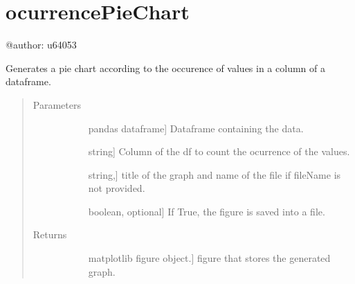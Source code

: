 \documentclass[letterpaper,10pt,english]{sphinxmanual}
\begin{document}
\chapter{ocurrencePieChart}
\label{\detokenize{rstFiles/ocurrencePieChart:module-ocurrencePieChart}}\label{\detokenize{rstFiles/ocurrencePieChart:ocurrencepiechart}}\label{\detokenize{rstFiles/ocurrencePieChart::doc}}
@author: u64053

\begin{fulllineitems}
\label{\detokenize{rstFiles/ocurrencePieChart:ocurrencePieChart.ocurrPieChart}}
Generates a pie chart according to 
the occurence of values in a column of a dataframe.
\begin{quote}\begin{description}
\item[{Parameters}] \leavevmode\begin{description}
\item[{}] \leavevmode{[}pandas dataframe{]}
Dataframe containing the data.

\item[{}] \leavevmode{[}string{]}
Column of the df to count the ocurrence of the values.

\item[{}] \leavevmode{[}string,{]}
title of the graph and name of the file 
if fileName is not provided.

\item[{}] \leavevmode{[}boolean, optional{]}
If True, the figure is saved into a file.

\end{description}

\item[{Returns}] \leavevmode\begin{description}
\item[{}] \leavevmode{[}matplotlib figure object.{]}
figure that stores the generated graph.


\end{description}
\end{description}
\end{quote}
\end{fulllineitems}
\end{document}

